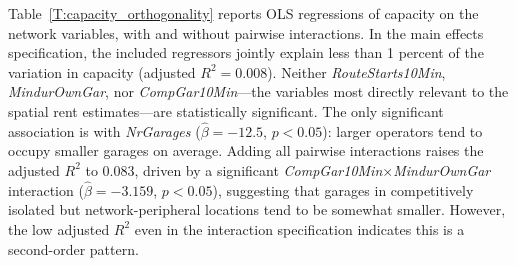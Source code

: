 \documentclass[12pt]{article}
\newcommand{\rootdir}{..}  %
\newcommand{\tables}{\rootdir/\rootdir/Output/tables}
\newcommand\fnote[1]{\captionsetup{font=small}\caption*{\emph{Notes}: #1}} %
\begin{document}
\begin{table}[!tb]
\caption{Pairwise correlation matrix: capacity and network 
variables\label{T:capacity_correlation}}
\resizebox{\textwidth}{!}{%
}
\fnote{Pairwise correlations computed across 61 garages with available 
PVR capacity data, using time-series averages of network variables over 
the full sample period 1995--2019. \textit{RouteStarts10Min}, 
\textit{MindurOwnGar}, \textit{CompGar10Min}, and \textit{NrGarages} 
are the network variables used in the baseline specification 
\eqref{eq:garagevalue_detail}. \textit{exp(YearsInc)} is the incumbency 
variable.}
\end{table}

Table~\ref{T:capacity_orthogonality} reports OLS regressions of capacity 
on the network variables, with and without pairwise interactions. In the 
main effects specification, the included regressors jointly explain less 
than 1 percent of the variation in capacity (adjusted $R^2 = 0.008$). 
Neither \textit{RouteStarts10Min}, \textit{MindurOwnGar}, nor 
\textit{CompGar10Min}---the variables most directly relevant to the spatial 
rent estimates---are statistically significant. The only significant 
association is with \textit{NrGarages} ($\hat{\beta} = -12.5$, $p<0.05$): 
larger operators tend to occupy smaller garages on average. Adding all pairwise interactions raises the 
adjusted $R^2$ to 0.083, driven by a significant 
\textit{CompGar10Min}$\times$\textit{MindurOwnGar} interaction 
($\hat{\beta} = -3.159$, $p<0.05$), suggesting that garages in competitively 
isolated but network-peripheral locations tend to be somewhat smaller. 
However, the low adjusted $R^2$ even in the interaction specification 
indicates this is a second-order pattern.

\begin{table}[!tb]
\caption{Orthogonality of garage capacity to network 
variables\label{T:capacity_orthogonality}}
\centering

\fnote{OLS regressions of garage capacity (Peak Vehicle Requirement) on 
the network variables used in the structural estimation. Each variable is 
averaged over the full sample period for each garage. The main effects 
specification includes each network variable separately; the interactions 
specification adds all pairwise products. Standard errors in parentheses. 
Statistical significance: + $p<0.1$, * $p<0.05$, ** $p<0.01$, 
*** $p<0.001$.}
\end{table}
\end{document}
